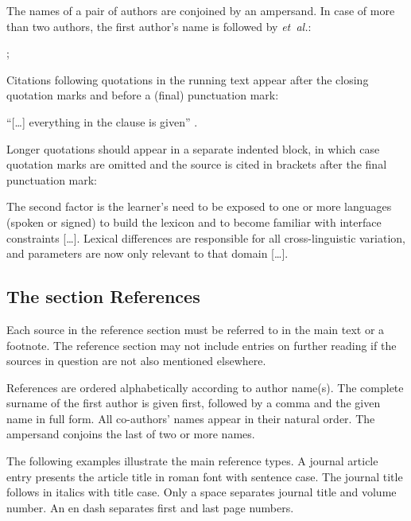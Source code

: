 \documentclass{zsarticle}
\begin{document}
The names of a pair of authors are conjoined by an ampersand. In case of more than two authors, the first author's name is followed by \emph{et~al.}:

\begin{zsquote}
\parencite{crainetal1986}; \parencite{blasietal22}
\end{zsquote}

Citations following quotations in the running text appear after the closing quotation marks and before a (final) punctuation mark:

\begin{zsquote}
\enquote{[\ldots] everything in the clause is given} \parencite[63]{vangelderen2022}.
\end{zsquote}

Longer quotations should appear in a separate indented block, in which case quotation marks are omitted and the source is cited in brackets after the final punctuation mark:

\begin{zsquote}
The second factor is the learner's need to be exposed to one or more languages (spoken or signed) to build the lexicon and to become familiar with interface constraints [\ldots]. Lexical differences are responsible for all cross-linguistic variation, and parameters are now only relevant to that domain [\ldots]. \parencite[3]{vangelderen2022}
\end{zsquote}

\subsection{The section References}\label{sec:refsection}

Each source in the reference section must be referred to in the main text or a footnote. The reference section may not include entries on further reading if the sources in question are not also mentioned elsewhere.

References are ordered alphabetically according to author name(s). The complete surname of the first author is given first, followed by a comma and the given name in full form. All co-authors' names appear in their natural order. The ampersand conjoins the last of two or more names.

The following examples illustrate the main reference types. A journal article entry \parencite{blasietal22} presents the article title in roman font with sentence case. The journal title follows in italics with title case. Only a space separates journal title and volume number. An en dash separates first and last page numbers.
\end{document}
